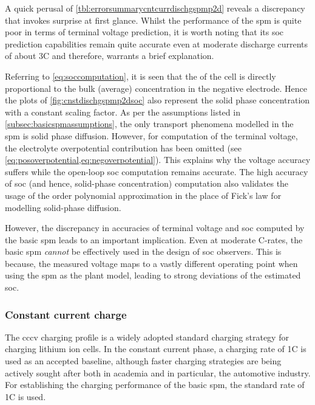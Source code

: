 

A   quick   perusal  of \cref{tbl:errorsummarycntcurrdischgspmp2d}   reveals   a
discrepancy that invokes surprise at first glance. Whilst the performance of the
\gls{spm} is  quite poor in  terms of terminal  voltage prediction, it  is worth
noting that its \gls{soc} prediction  capabilities remain quite accurate even at
moderate  discharge  currents  of  about  3C and  therefore,  warrants  a  brief
explanation.

Referring to \cref{eq:soccomputation}, it is  seen that the  of
the cell  is directly proportional  to the  bulk (average) concentration  in the
negative  electrode.  Hence  the  plots  of \cref{fig:cnstdischgspmp2dsoc}  also
represent the solid  phase concentration with a constant scaling  factor. As per
the assumptions listed  in \cref{subsec:basicspmassumptions}, the only transport
phenomena  modelled in  the \gls{spm}  is  solid phase  diffusion. However,  for
computation of the terminal  voltage, the electrolyte overpotential contribution
has  been   omitted  (see \cref{eq:posoverpotential,eq:negoverpotential}).  This
explains  why  the  voltage  accuracy  suffers  while  the  open-loop  \gls{soc}
computation  remains  accurate.  The  high accuracy  of  \gls{soc}  (and  hence,
solid-phase  concentration)   computation  also  validates  the   usage  of  the
 order polynomial  approximation in the place of  Fick's law for
modelling solid-phase diffusion.

However,  the  discrepancy  in  accuracies of  terminal  voltage  and  \gls{soc}
computed  by the  basic \gls{spm}  leads to  an important  implication. Even  at
moderate C-rates, the  basic \gls{spm} \emph{cannot} be effectively  used in the
design of \gls{soc}  observers. This is because, the measured  voltage maps to a
vastly different  operating point when using  the \gls{spm} as the  plant model,
leading to strong deviations of the estimated \gls{soc}.


\subsubsection*{Constant current charge}\label{subsubsec:cnstcurrchgsim}

The \gls{cccv} charging  profile is a widely adopted  standard charging strategy
for charging lithium  ion cells. In the constant current  phase, a charging rate
of 1C is  used as an accepted baseline, although  faster charging strategies are
being actively sought  after both in academia and in  particular, the automotive
industry. For establishing the charging performance of the basic \gls{spm}, the
standard rate of 1C is used.

